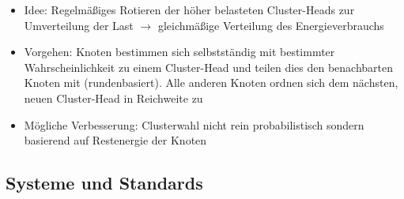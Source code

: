 \begin{itemize}
\begin{itemize}
\begin{itemize}
\begin{itemize}
				\item Idee: Regelmäßiges Rotieren der höher belasteten Cluster-Heads zur Umverteilung der Last \(\rightarrow\) gleichmäßige Verteilung des Energieverbrauchs
				\item Vorgehen: Knoten bestimmen sich selbstständig mit bestimmter Wahrscheinlichkeit zu einem Cluster-Head und teilen dies den benachbarten Knoten mit (rundenbasiert). Alle anderen Knoten ordnen sich dem nächsten, neuen Cluster-Head in Reichweite zu
				\item Mögliche Verbesserung: Clusterwahl nicht rein probabilistisch sondern basierend auf Restenergie der Knoten
			\end{itemize}
		\end{itemize}
	\end{itemize}
\end{itemize}


\subsection{Systeme und Standards}


